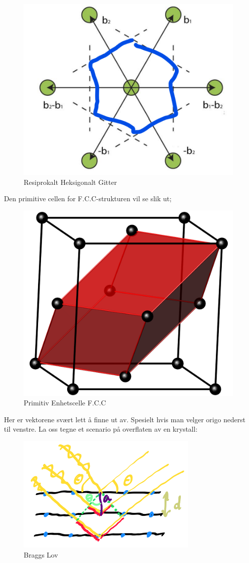 \documentclass{article}
\begin{document}
\begin{figure}[H]
\begin{minipage}[b]{0.45\linewidth}
        \includegraphics[width=\linewidth]{bilder_lf/resiprokalt_gitter_heksagonalt.png}
        \caption{Resiprokalt Heksigonalt Gitter}
        \label{fig:resiprokalt_gitter_heksagonalt}
    \end{minipage}
\end{figure}
Den primitive cellen for F.C.C-strukturen vil se slik ut;
\begin{figure}
    \centering
    \includegraphics[width=0.5\linewidth]{bilder_lf/primitiv_struktur_fcc.png}
    \caption{Primitiv Enhetscelle F.C.C}
    \label{fig:primitiv_struktur_fcc }
\end{figure}
Her er vektorene svært lett å finne ut av. Spesielt hvis man velger origo nederst til venstre.
\nyside
{}
La oss tegne et scenario på overflaten av en krystall:
\begin{figure}[H]
    \centering
    \includegraphics[width=0.5\linewidth]{bilder_lf/braggs_lov.png}
    \caption{Braggs Lov}
    \label{fig:braggs_lov}
\end{figure}
\end{document}

